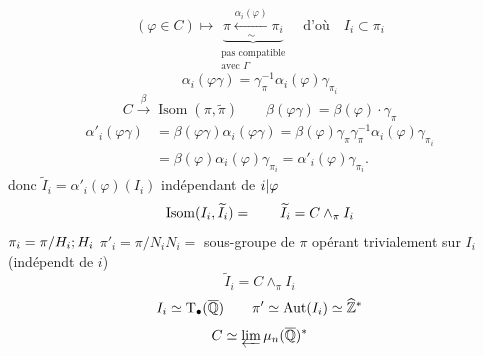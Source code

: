 \[
(\varphi\in C)\longmapsto\underbrace{\pi\xleftarrow[\sim]{\alpha_i(\varphi)}\pi_i}_{\substack{\text{pas compatible}\\\text{avec }\Gamma}}\quad\text{d'où}\quad I_i\subset\pi_i
\]
\[
\alpha_i(\varphi\gamma)=\gamma_\pi^{-1}\alpha_i(\varphi)\gamma_{\pi_i}
\]
\[
C\xrightarrow{\beta}\operatorname{Isom}(\pi,\widetilde\pi)\qquad\beta(\varphi\gamma)=\beta(\varphi)\cdot\gamma_\pi
\]
\[
\begin{aligned}
\alpha'_i(\varphi\gamma)&=\beta(\varphi\gamma)\alpha_i(\varphi\gamma)=\beta(\varphi)\gamma_\pi\gamma_\pi^{-1}\alpha_i(\varphi)\gamma_{\pi_i}\\
&=\beta(\varphi)\alpha_i(\varphi)\gamma_{\pi_i}=\alpha'_i(\varphi)\gamma_{\pi_i}.
\end{aligned}
\]
donc $\widetilde I_i=\alpha'_i(\varphi)(I_i)$ indépendant de $i|\varphi$
\[
\operatorname{Isom}(I_i,\widetilde I_i)=\qquad\widetilde I_i=C\wedge_\pi I_i
\]
\quad $\pi_i=\pi/H_i;H_i$
\quad $\pi'_i=\pi/N_i$\quad $N_i=$ sous-groupe de $\pi$ opérant trivialement sur $I_i$ (indépendt de $i$)
\[
\widetilde I_i=C\wedge_\pi I_i
\]
\[
I_i\simeq\mathrm T_{\bullet}(\overline{\mathbb Q})\qquad\pi'\simeq\operatorname{Aut}(I_i)\simeq\widehat{\mathbb Z}^{*}
\]
\[
C\simeq\varprojlim\mu_n(\overline{\mathbb Q})^{*}
\]
